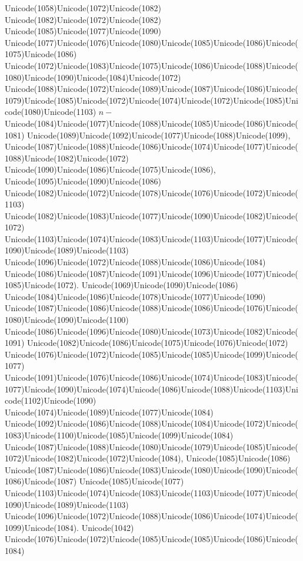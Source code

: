 \documentclass[a4paper,11pt]{report}
\begin{document}
{{{\begin{Verbatim}[commandchars=!@|,fontsize=\small,frame=single,label=Пример]
\end{Verbatim}
 Unicode(1058)Unicode(1072)Unicode(1082)
Unicode(1082)Unicode(1072)Unicode(1082)
Unicode(1085)Unicode(1077)Unicode(1090)
Unicode(1077)Unicode(1076)Unicode(1080)Unicode(1085)Unicode(1086)Unicode(1075)Unicode(1086)
Unicode(1072)Unicode(1083)Unicode(1075)Unicode(1086)Unicode(1088)Unicode(1080)Unicode(1090)Unicode(1084)Unicode(1072)
Unicode(1088)Unicode(1072)Unicode(1089)Unicode(1087)Unicode(1086)Unicode(1079)Unicode(1085)Unicode(1072)Unicode(1074)Unicode(1072)Unicode(1085)Unicode(1080)Unicode(1103) $n-$Unicode(1084)Unicode(1077)Unicode(1088)Unicode(1085)Unicode(1086)Unicode(1081)
Unicode(1089)Unicode(1092)Unicode(1077)Unicode(1088)Unicode(1099),
Unicode(1087)Unicode(1088)Unicode(1086)Unicode(1074)Unicode(1077)Unicode(1088)Unicode(1082)Unicode(1072)
Unicode(1090)Unicode(1086)Unicode(1075)Unicode(1086),
Unicode(1095)Unicode(1090)Unicode(1086)
Unicode(1082)Unicode(1072)Unicode(1078)Unicode(1076)Unicode(1072)Unicode(1103)
Unicode(1082)Unicode(1083)Unicode(1077)Unicode(1090)Unicode(1082)Unicode(1072)
Unicode(1103)Unicode(1074)Unicode(1083)Unicode(1103)Unicode(1077)Unicode(1090)Unicode(1089)Unicode(1103)
Unicode(1096)Unicode(1072)Unicode(1088)Unicode(1086)Unicode(1084)
Unicode(1086)Unicode(1087)Unicode(1091)Unicode(1096)Unicode(1077)Unicode(1085)Unicode(1072).
Unicode(1069)Unicode(1090)Unicode(1086)
Unicode(1084)Unicode(1086)Unicode(1078)Unicode(1077)Unicode(1090)
Unicode(1087)Unicode(1086)Unicode(1088)Unicode(1086)Unicode(1076)Unicode(1080)Unicode(1090)Unicode(1100)
Unicode(1086)Unicode(1096)Unicode(1080)Unicode(1073)Unicode(1082)Unicode(1091)
Unicode(1082)Unicode(1086)Unicode(1075)Unicode(1076)Unicode(1072)
Unicode(1076)Unicode(1072)Unicode(1085)Unicode(1085)Unicode(1099)Unicode(1077)
Unicode(1091)Unicode(1076)Unicode(1086)Unicode(1074)Unicode(1083)Unicode(1077)Unicode(1090)Unicode(1074)Unicode(1086)Unicode(1088)Unicode(1103)Unicode(1102)Unicode(1090)
Unicode(1074)Unicode(1089)Unicode(1077)Unicode(1084)
Unicode(1092)Unicode(1086)Unicode(1088)Unicode(1084)Unicode(1072)Unicode(1083)Unicode(1100)Unicode(1085)Unicode(1099)Unicode(1084)
Unicode(1087)Unicode(1088)Unicode(1080)Unicode(1079)Unicode(1085)Unicode(1072)Unicode(1082)Unicode(1072)Unicode(1084),
Unicode(1085)Unicode(1086)
Unicode(1087)Unicode(1086)Unicode(1083)Unicode(1080)Unicode(1090)Unicode(1086)Unicode(1087)
Unicode(1085)Unicode(1077)
Unicode(1103)Unicode(1074)Unicode(1083)Unicode(1103)Unicode(1077)Unicode(1090)Unicode(1089)Unicode(1103)
Unicode(1096)Unicode(1072)Unicode(1088)Unicode(1086)Unicode(1074)Unicode(1099)Unicode(1084).
Unicode(1042)
Unicode(1076)Unicode(1072)Unicode(1085)Unicode(1085)Unicode(1086)Unicode(1084)
}}}
\end{document}
